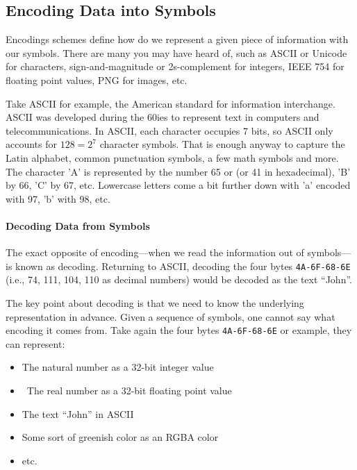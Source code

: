\documentclass{aldast}
\begin{document}
\subsection{Encoding Data into Symbols}

Encodings schemes define how do we represent a given piece of
information with our symbols. There are many you may have heard of,
such as ASCII or Unicode for characters, sign-and-magnitude or
2s-complement for integers, IEEE 754 for floating point values, PNG
for images, etc.

Take ASCII for example, the American standard for information
interchange. ASCII was developed during the 60ies to represent text in
computers and telecommunications. In ASCII, each character occupies 7
bits, so ASCII only accounts for $128=2^7$ character symbols. That is
enough anyway to capture the Latin alphabet, common punctuation
symbols, a few math symbols and more. The character 'A' is represented
by the number 65 or (or 41 in hexadecimal), 'B' by 66, 'C' by 67,
etc. Lowercase letters come a bit further down with 'a' encoded with
97, 'b' with 98, etc.

\paragraph{Decoding Data from Symbols}

The exact opposite of encoding---when we read the information out of
symbols---is known as decoding. Returning to ASCII, decoding the four
bytes \texttt{4A-6F-68-6E} (i.e., 74, 111, 104, 110 as decimal
numbers) would be decoded as the text ``John''.

The key point about decoding is that we need to know the underlying
representation in advance. Given a sequence of symbols, one cannot say what
encoding it comes from. Take again the four bytes \texttt{4A-6F-68-6E} or
example, they can represent:

\begin{itemize}
\item The natural number  as a 32-bit integer value
\item The real number  as a 32-bit floating point value
\item The text ``John'' in ASCII
\item Some sort of \textcolor{testColor}{greenish color} as an RGBA color
\item etc.
\end{itemize}
\end{document}
